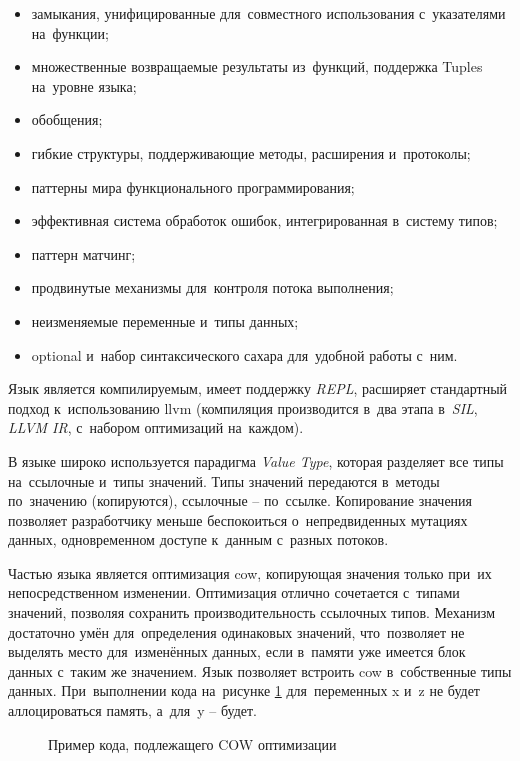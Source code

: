 \begin{itemize}
	\item замыкания, унифицированные для~совместного использования с~указателями на~функции;
	\item множественные возвращаемые результаты из~функций, поддержка Tuples на~уровне языка;
	\item обобщения;
	\item гибкие структуры, поддерживающие методы, расширения и~протоколы;
	\item паттерны мира функционального программирования;
	\item эффективная система обработок ошибок, интегрированная в~систему типов;
	\item паттерн матчинг;
	\item продвинутые механизмы для~контроля потока выполнения;
	\item неизменяемые переменные и~типы данных;
	\item optional и~набор синтаксического сахара для~удобной работы с~ним.
\end{itemize}

Язык является компилируемым, имеет поддержку \textit{REPL}, расширяет стандартный подход к~использованию \gls{llvm} (компиляция производится в~два этапа в~\textit{SIL}, \textit{LLVM IR}, с~набором оптимизаций на~каждом).

В языке широко используется парадигма \textit{Value Type}, которая разделяет все типы на~ссылочные и~типы значений. Типы значений передаются в~методы по~значению (копируются), ссылочные -- по~ссылке. Копирование значения позволяет разработчику меньше беспокоиться о~непредвиденных мутациях данных, одновременном доступе к~данным с~разных потоков.

Частью языка является оптимизация \gls{cow}, копирующая значения только при~их непосредственном изменении. Оптимизация отлично сочетается с~типами значений, позволяя сохранить производительность ссылочных типов. Механизм достаточно умён для~определения одинаковых значений, что~позволяет не выделять место для~изменённых данных, если в~памяти уже имеется блок данных с~таким же значением. Язык позволяет встроить \gls{cow} в~собственные типы данных. При~выполнении кода на~рисунке \ref{sec:development:arch:ios:swift:code:cow} для~переменных x и~z не будет аллоцироваться память, а~для~y -- будет.

\begin{figure}[h]
	
   \caption{Пример кода, подлежащего COW оптимизации}
   \label{sec:development:arch:ios:swift:code:cow}
\end{figure}

